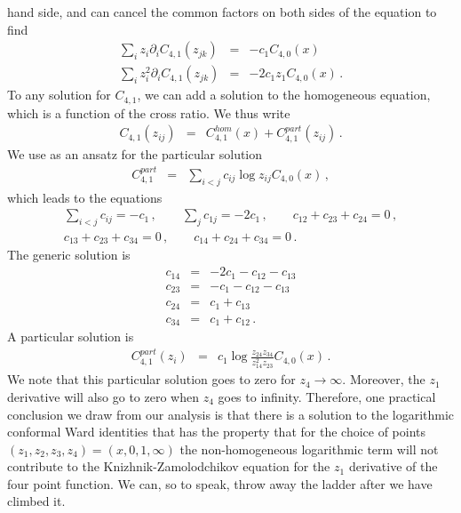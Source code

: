 \documentclass[12pt]{article}
\numberwithin{equation}{section}
\numberwithin{equation}{section}
\numberwithin{table}{section}\setlength{\multlinegap}{25pt}
\begin{document}
hand side, and can cancel the common factors on both sides of the equation to find
\begin{eqnarray}
\sum_i z_i \partial_i  C_{4,1}(z_{jk}) &=& -c_1 C_{4,0}(x)
\nonumber \\
\sum_i z_i^2 \partial_i  C_{4,1}(z_{jk}) &=& -2 c_1 z_1 C_{4,0}(x)  \, .
\end{eqnarray}
To any solution for $C_{4,1}$, we can add a solution to the homogeneous equation, which is a function of the cross ratio.
We thus write
\begin{eqnarray}
C_{4,1} (z_{ij}) &=& C_{4,1}^{hom}(x) + C_{4,1}^{part} (z_{ij}) \, . \label{solWard41}
\end{eqnarray}
We use as an ansatz for the particular solution
\begin{eqnarray}
C_{4,1}^{part} &=& \sum_{i<j} c_{ij} \log z_{ij} C_{4,0}(x)
\, ,
\end{eqnarray}
which leads to the equations
\begin{eqnarray}
\sum_{i<j} c_{ij} = -c_1 \, ,
\qquad
\sum_{j} c_{1j} = -2 c_1 \, ,
\qquad
c_{12}+c_{23}+c_{24} = 0 \, ,
\nonumber \\
c_{13}+c_{23}+c_{34} = 0 \, ,
\qquad
c_{14}+c_{24}+c_{34} =0 \, .
\end{eqnarray}
The generic solution is
\begin{eqnarray}
c_{14} &=& -2 c_1 -c_{12} - c_{13} \nonumber \\
c_{23} &=& -c_1 - c_{12} - c_{13} \nonumber \\
c_{24} &=&  c_1 + c_{13} \nonumber \\
c_{34} &=&  c_1 + c_{12} \, .
\end{eqnarray}
A particular solution is
\begin{eqnarray}
C_{4,1}^{part}(z_i) &=&  c_1 \log \frac{z_{24} z_{34} }{z_{14}^2 z_{23}} C_{4,0}(x) \, . \label{logfourpointpart}
\end{eqnarray}
We note that this particular solution goes to zero for $z_4 \rightarrow \infty$. Moreover, the $z_1$ derivative will also go to zero
when $z_4$ goes to infinity. Therefore, one practical conclusion we draw from our analysis is 
that there is a solution to the logarithmic conformal Ward identities that has the property that
for the choice of points $(z_1,z_2,z_3,z_4)=(x,0,1,\infty)$ the non-homogeneous logarithmic term will not contribute to the Knizhnik-Zamolodchikov equation 
for the $z_1$ derivative of the four point function. We can, so to speak, throw away the ladder after we have climbed it.
\end{document}

